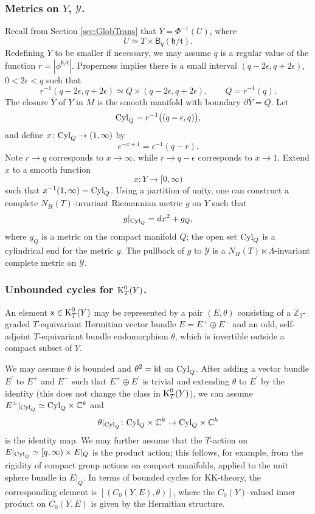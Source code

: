 \documentclass[11pt,reqno]{amsart}
\theoremstyle{definition}
\theoremstyle{remark}
\newcommand{\ol}[1]{\overline{#1}}
\newcommand{\st}[1]{\mathsf{#1}}
\def\t{\ensuremath{\mathfrak{t}}}
\def\h{\ensuremath{\mathfrak{h}}}
\def\Y{\ensuremath{\mathcal{Y}}}
\def\K{\ensuremath{\mathcal{K}}}
\def\bC{\ensuremath{\mathbb{C}}}
\def\bZ{\ensuremath{\mathbb{Z}}}
\def\id{\ensuremath{\textnormal{id}}}
\def\K{\ensuremath{\textnormal{K}}}
\def\Cyl{\ensuremath{\textnormal{Cyl}}}
\begin{document}
\subsubsection{Metrics on $Y$, $\Y$.}
Recall from Section \ref{sec:GlobTrans} that $Y=\Phi^{-1}(U)$, where
\[ U \simeq T \times \st{B}_q(\h/\t).\]
Redefining $Y$ to be smaller if necessary, we may assume $q$ is a regular value of the function $r=|\phi^{\h/\t}|$.  Properness implies there is a small interval $(q-2\epsilon,q+2\epsilon)$, $0<2\epsilon<q$ such that
\[ r^{-1}(q-2\epsilon,q+2\epsilon) \simeq Q \times (q-2\epsilon,q+2\epsilon), \qquad Q=r^{-1}(q).\]
The closure $\ol{Y}$ of $Y$ in $M$ is the smooth manifold with boundary $\partial \ol{Y}=Q$. Let
\[ \Cyl_Q=r^{-1}\big((q-\epsilon,q)\big),\]
and define $x \colon \Cyl_Q \rightarrow (1, \infty)$ by
\[ e^{-x+1}=\epsilon^{-1}(q-r).\]
Note $r \rightarrow q$ corresponds to $x \rightarrow \infty$, while $r \rightarrow q-\epsilon$ corresponds to $x \rightarrow 1$.  Extend $x$ to a smooth function
\begin{equation} 
\label{eqn:Extendx}
x \colon Y \rightarrow [0,\infty) 
\end{equation}
such that $x^{-1}(1,\infty)=\Cyl_Q$.  Using a partition of unity, one can construct a complete $N_H(T)$-invariant Riemannian metric $g$ on $Y$ such that
\[ g|_{\Cyl_Q}=dx^2+g_Q,\]
where $g_Q$ is a metric on the compact manifold $Q$; the open set $\Cyl_Q$ is a cylindrical end for the metric $g$.  The pullback of $g$ to $\Y$ is a $N_H(T)\ltimes \Lambda$-invariant complete metric on $\Y$.

\subsubsection{Unbounded cycles for $\K_T^0(Y)$.}\label{sec:UnboundedRepresentative}
An element $\st{x} \in \K^0_T(Y)$ may be represented by a pair $(E,\theta)$ consisting of a $\bZ_2$-graded $T$-equivariant Hermitian vector bundle $E=E^+\oplus E^-$ and an odd, self-adjoint $T$-equivariant bundle endomorphism $\theta$, which is invertible outside a compact subset of $Y$.

We may assume $\theta$ is bounded and $\theta^2=\id$ on $\Cyl_Q$.  After adding a vector bundle $E^\prime$ to $E^+$ and $E^-$ such that $E^+\oplus E^\prime$ is trivial and extending $\theta$ to $E^\prime$ by the identity (this does not change the class in $\K_T^0(Y)$), we can assume $E^{\pm}|_{\Cyl_Q} \simeq \Cyl_Q \times \bC^k$ and 
\[ \theta|_{\Cyl_Q}\colon \Cyl_Q \times \bC^k \rightarrow \Cyl_Q \times \bC^k \] 
is the identity map.  We may further assume that the $T$-action on $E|_{\Cyl_Q} \simeq [q,\infty) \times E|_Q$ is the product action; this follows, for example, from the rigidity of compact group actions on compact manifolds, applied to the unit sphere bundle in $E|_Q$.  In terms of bounded cycles for KK-theory, the corresponding element is $[(C_0(Y,E),\theta)]$, where the $C_0(Y)$-valued inner product on $C_0(Y,E)$ is given by the Hermitian structure.
\end{document}
